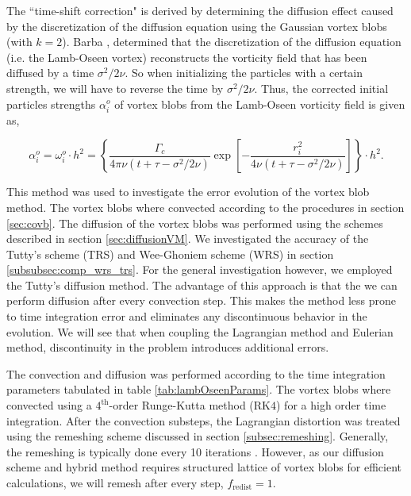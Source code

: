 The ``time-shift correction" is derived by determining the diffusion effect caused by the discretization of the diffusion equation using the Gaussian vortex blobs (with $k=2$). Barba \cite{Barba2004c}, determined that the discretization of the diffusion equation (i.e. the Lamb-Oseen vortex) reconstructs the vorticity field that has been diffused by a time $\sigma^2/2\nu$. So when initializing the particles with a certain strength, we will have to reverse the time by $\sigma^2/2\nu$. Thus, the corrected initial particles strengths $\alpha_i^o$ of vortex blobs from the Lamb-Oseen vorticity field is given as,

	\begin{equation}
	\alpha_i^o = \omega_i^o\cdot h^2 = \left\{ \frac{\Gamma_c}{4\pi\nu\left(t+\tau-\sigma^2/2\nu\right)} \exp\left[-\frac{r_i^2}{4\nu\left(t+\tau-\sigma^2/2\nu\right)}\right] \right\} \cdot h^2.
	\label{eq:lo_pie}
	\end{equation}
	
This method was used to investigate the error evolution of the vortex blob method. The vortex blobs where convected according to the procedures in section \ref{sec:covb}. The diffusion of the vortex blobs was performed using the schemes described in section \ref{sec:diffusionVM}. We investigated the accuracy of the Tutty's scheme (TRS) and Wee-Ghoniem scheme (WRS) in section \ref{subsubsec:comp_wrs_trs}. For the general investigation however, we employed the Tutty's diffusion method. The advantage of this approach is that the we can perform diffusion after every convection step. This makes the method less prone to time integration error and eliminates any discontinuous behavior in the evolution. We will see that when coupling the Lagrangian method and Eulerian method, discontinuity in the problem introduces additional errors.

%	
	


The convection and diffusion was performed according to the time integration parameters tabulated in table \ref{tab:lambOseenParams}. The vortex blobs where convected using a $4^{\mathrm{th}}$-order Runge-Kutta method ($\mathrm{RK4}$) for a high order time integration. After the convection substeps, the Lagrangian distortion was treated using the remeshing scheme discussed in section \ref{subsec:remeshing}. Generally, the remeshing is typically done every 10 iterations \cite{Barba2004c}. However, as our diffusion scheme and hybrid method requires structured lattice of vortex blobs for efficient calculations, we will remesh after every step, $f_{\mathrm{redist}}=1$.  


